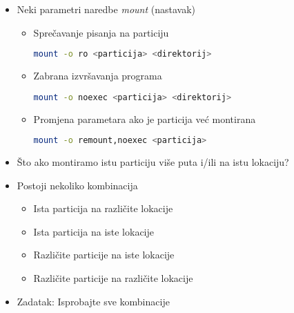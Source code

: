 \documentclass[croatian,t]{beamer} %
\begin{document}
	\begin{frame}[fragile]
		\begin{itemize}
			\item Neki parametri naredbe \textit{mount} (nastavak)
			\begin{itemize}
				\item Sprečavanje pisanja na particiju
				\begin{lstlisting}[basicstyle={\footnotesize\ttfamily},language=bash]
					mount -o ro <particija> <direktorij>
				\end{lstlisting}
				\item Zabrana izvršavanja programa
				\begin{lstlisting}[basicstyle={\footnotesize\ttfamily},language=bash]
					mount -o noexec <particija> <direktorij>
				\end{lstlisting}
				\item Promjena parametara ako je particija već montirana
				\begin{lstlisting}[basicstyle={\footnotesize\ttfamily},language=bash]
					mount -o remount,noexec <particija>
				\end{lstlisting}
			\end{itemize}
			\item Što ako montiramo istu particiju više puta i/ili na istu lokaciju?
			\item Postoji nekoliko kombinacija
			\begin{itemize}
				\item Ista particija na različite lokacije
				\item Ista particija na iste lokacije
				\item Različite particije na iste lokacije
				\item Različite particije na različite lokacije
			\end{itemize}
			\item Zadatak: Isprobajte sve kombinacije
		\end{itemize}
	\end{frame}
	
\end{document}
